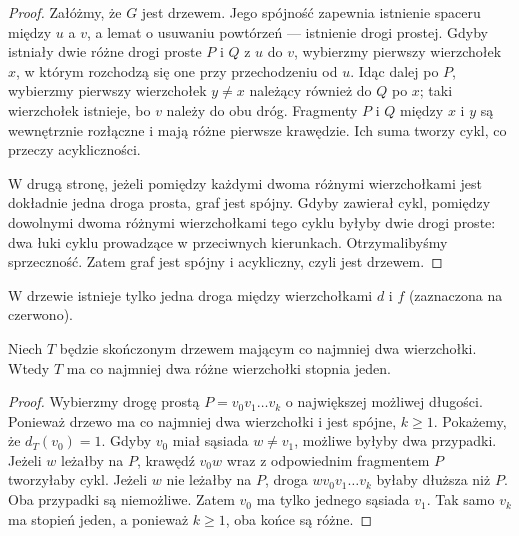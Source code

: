 \begin{proof}
Załóżmy, że $G$ jest drzewem. Jego spójność zapewnia
istnienie spaceru między $u$ a $v$, a lemat o usuwaniu
powtórzeń --- istnienie drogi prostej. Gdyby istniały
dwie różne drogi proste $P$ i $Q$ z $u$ do $v$,
wybierzmy pierwszy wierzchołek $x$, w którym
rozchodzą się one przy przechodzeniu od $u$.
Idąc dalej po $P$, wybierzmy pierwszy wierzchołek
$y\ne x$ należący również do $Q$ po $x$;
taki wierzchołek istnieje, bo $v$ należy do obu
dróg. Fragmenty $P$ i $Q$ między $x$ i $y$
są wewnętrznie rozłączne i mają różne pierwsze
krawędzie. Ich suma tworzy cykl, co przeczy
acykliczności.

W drugą stronę, jeżeli pomiędzy każdymi dwoma
różnymi wierzchołkami jest dokładnie jedna droga
prosta, graf jest spójny. Gdyby zawierał cykl,
pomiędzy dowolnymi dwoma różnymi wierzchołkami
tego cyklu byłyby dwie drogi proste: dwa łuki
cyklu prowadzące w przeciwnych kierunkach.
Otrzymalibyśmy sprzeczność. Zatem graf jest
spójny i acykliczny, czyli jest drzewem.
\end{proof}

\begin{center}

{\footnotesize W drzewie istnieje tylko jedna droga między
wierzchołkami $d$ i $f$ (zaznaczona na czerwono).}
\end{center}

\begin{lemat}
Niech $T$ będzie skończonym drzewem mającym
co najmniej dwa wierzchołki. Wtedy $T$ ma
co najmniej dwa różne wierzchołki stopnia jeden.
\end{lemat}

\begin{proof}
Wybierzmy drogę prostą $P=v_0v_1\ldots v_k$
o największej możliwej długości. Ponieważ drzewo
ma co najmniej dwa wierzchołki i jest spójne,
$k\ge1$. Pokażemy, że $d_T(v_0)=1$.
Gdyby $v_0$ miał sąsiada $w\ne v_1$, możliwe
byłyby dwa przypadki. Jeżeli $w$ leżałby na
$P$, krawędź $v_0w$ wraz z odpowiednim fragmentem
$P$ tworzyłaby cykl. Jeżeli $w$ nie leżałby
na $P$, droga $wv_0v_1\ldots v_k$ byłaby
dłuższa niż $P$. Oba przypadki są niemożliwe.
Zatem $v_0$ ma tylko jednego sąsiada $v_1$.
Tak samo $v_k$ ma stopień jeden, a ponieważ
$k\ge1$, oba końce są różne.
\end{proof}

